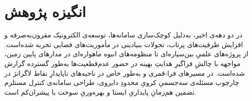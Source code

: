%
%
%
\section{انگیزه پژوهش}\label{sec:motivation}

در دو دهه‌ی اخیر، به‌دلیل کوچک‌سازی سامانه‌ها، توسعه‌ی الکترونیک مقرون‌به‌صرفه و افزایش ظرفیت‌های پرتاب، تحولات بنیادینی در مأموریت‌های فضایی تجربه شده‌است. از پروژه‌های علمیِ بین‌سیاره‌ای تا منظومه‌های انبوه ماهواره‌ای در مدارهای پایین زمین، مواجهه با چالشِ فراگیرِ هدایتِ بهینه در حضور عدم‌قطعیت‌ها به‌طور گسترده گزارش شده‌است. در مسیرهای فرا-قمری
و به‌طور خاص در ناحیه‌های ناپایدارِ نقاط لاگرانژ در چارچوب مسئله‌ی سه‌جسمیِ کرویِ محدودِ دایروی، طراحی سامانه‌ی کنترل مستلزم تضمین هم‌زمانِ پایداریِ ایستا و بهره‌وریِ سوخت با پیشران‌کم است.

